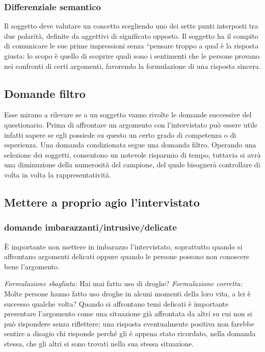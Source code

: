 \subsubsection{Differenziale semantico}
Il soggetto deve valutare un concetto scegliendo uno dei sette punti interposti tra due polarità, definite da aggettivi di significato opposto. Il soggetto ha il compito di comunicare le sue prime impressioni senza “pensare troppo a qual è la risposta giusta: lo scopo è quello di scoprire quali sono i sentimenti che le persone provano nei confronti di certi argomenti, favorendo la formulazione di una risposta sincera.

\subsection{Domande filtro}
Esse mirano a rilevare se a un soggetto vanno rivolte le domande successive del questionario. Prima di affrontare un argomento con l’intervistato può essere utile infatti sapere se egli possiede su questo un certo grado di competenza o di esperienza. Una domanda condizionata segue una domanda filtro. Operando una selezione dei soggetti, consentono un notevole risparmio di tempo, tuttavia si avrà una diminuzione della numerosità del campione, del quale bisognerà controllare di volta in volta la rappresentatività.

\subsection{Mettere a proprio agio l'intervistato}
\subsubsection{domande imbarazzanti/intrusive/delicate}
È importante non mettere in imbarazzo l’intervistato, soprattutto quando si affrontano argomenti delicati oppure quando le persone possono non conoscere bene l’argomento.

\textit{Formulazione sbagliata:} Hai mai fatto uso di droghe?
\textit{Formulazione corretta:} Molte persone hanno fatto uso droghe in alcuni momenti della loro vita, a lei è successo qualche volta? \newline
Quando si affrontano temi delicati è importante presentare l'argomento come una situazione già affrontata da altri su cui non si può rispondere senza riflettere; una risposta eventualmente positiva non farebbe sentire a disagio chi risponde perché gli è appena stato ricordato, nella domanda stessa, che gli altri si sono trovati nella sua stessa situazione.

